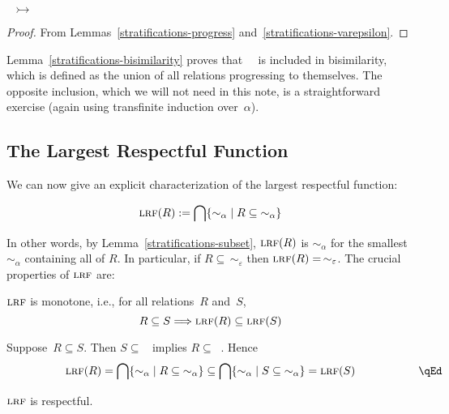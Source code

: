 \documentclass{CSML}
\theoremstyle{definition}
\newcommand{\progress}{\rightarrowtail}
\newcommand{\LRF}{\mbox{\sc{lrf}}}  \newcommand{\R}{\mathrel{R}}
\begin{document}
\begin{lem}
\label{stratifications-bisimilarity}
$\mathop{\sim_\varepsilon} \progress \mathop{\sim_\varepsilon}$
\end{lem}

\begin{proof}
From Lemmas~\ref{stratifications-progress}
and~\ref{stratifications-varepsilon}.
\end{proof}

Lemma~\ref{stratifications-bisimilarity} proves
that~$\mathop{\sim_\varepsilon}$ is included in bisimilarity, which is
defined as the union of all relations progressing to themselves.  The
opposite inclusion, which we will not need in this note, is a
straightforward exercise (again using transfinite induction
over~$\alpha$).

\subsection{The Largest Respectful Function}

We can now give an explicit characterization of the largest respectful
function:

\begin{defi}[$\LRF$]
\label{definition-LRF}
$$\LRF(R) := \bigcap \{\mathop{\sim_\alpha} \mid R \subseteq
  \mathop{\sim_\alpha}\}$$
\end{defi}

In other words, by Lemma~\ref{stratifications-subset}, $\LRF(R)$ is
$\sim_\alpha$ for the smallest $\sim_\alpha$ containing all of $R$. In
particular, if $R \subseteq\, \sim_\varepsilon$ then $\LRF(R) =\,
\sim_\varepsilon$. The crucial properties of $\LRF$ are:

\begin{lem}
\label{monotone}
$\LRF$ is monotone, i.e., for all relations~$R$ and~$S$, $$R \subseteq
S \Longrightarrow \LRF(R) \subseteq \LRF(S)$$
\end{lem}

\proof
Suppose~$R \subseteq S$.  Then $S \subseteq \mathop{\sim_\alpha}$
implies $R \subseteq \mathop{\sim_\alpha}$.  Hence $$\LRF(R) = \bigcap
\{\mathop{\sim_\alpha} \mid R \subseteq \mathop{\sim_\alpha}\}
\subseteq \bigcap \{\mathop{\sim_\alpha} \mid S \subseteq
\mathop{\sim_\alpha}\} = \LRF(S)
\rlap{\hbox to 77 pt{\hfill\qEd}}$$
\newpage

\begin{thm}
\label{lrf-is-respectful}
$\LRF$ is respectful.
\end{thm}
\end{document}
